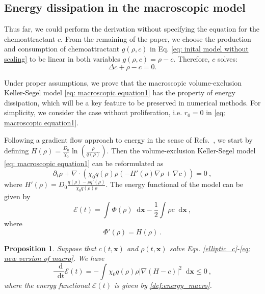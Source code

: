 \documentclass{aims} %
\newtheorem{proposition}[theorem]{Proposition}
\theoremstyle{definition}
\newcommand {\bx} { {\mathbf{x}} }
\newcommand*\diff{\mathop{}\!\mathrm{d}}
\begin{document}
\subsection{Energy dissipation in the macroscopic model} \label{subsec:energy}
Thus far, we could perform the derivation without specifying the equation for the chemoattractant $c$. From the remaining of the paper, we choose the production and consumption of chemoattractant $g(\rho,c)$ in Eq. \eqref{eq: inital model without scaling} to be linear in both variables $g(\rho,c) = \rho - c$. Therefore, $c$ solves:
\begin{equation}\label{elliptic_c}
   \Delta c + \rho - c = 0. 
\end{equation}

Under proper assumptions, we prove that the macroscopic volume-exclusion Keller-Segel model \eqref{eq: macroscopic equation1} has the property of energy dissipation, which will be a key feature to be preserved in numerical methods.
 For simplicity, we consider the case without proliferation, i.e. $r_0 = 0$ in \eqref{eq: macroscopic equation1}. 

Following a gradient flow approach to energy in the sense of Refs.~\cite{de2018energy,calvez2006volume,carrillo2001entropy}, we start by defining $H(\rho) = \frac{D_0}{\chi_0}\ln\left(\frac{\rho}{q(\rho)}\right)$. %
Then the volume-exclusion Keller-Segel model \eqref{eq: macroscopic equation1} can be reformulated as 
\begin{equation}
    \partial_t\rho+\nabla\cdot(\chi_0 q(\rho)\rho(-H'(\rho)\nabla\rho+\nabla c))= 0\ , \label{eq: new version of macro}
\end{equation}
where $H'(\rho)=D_0\frac{q(\rho)-\rho q'(\rho)}{\chi_0 q(\rho)\rho}$.
The energy functional of the model can be given by {{
\begin{equation}\label{def:energy_macro}
    \mathcal{E}(t)=\int\Phi(\rho)\diff \mathbf{x}-\frac{1}{2}\int\rho c\diff \mathbf{x}\ ,
\end{equation}
}}
where 
\begin{equation}\label{functionPhi}
    \Phi'(\rho)=H(\rho)\ .
\end{equation}


\begin{proposition}\label{prop:energy}
Suppose that $c(t,\mathbf{x})$ and $\rho(t,\mathbf{x})$ solve Eqs. \eqref{elliptic_c}-\eqref{eq: new version of macro}. We have
\begin{equation}
    \frac{\diff}{\diff t}\mathcal{E}(t)=-\int \chi_0 q(\rho)\rho|\nabla(H-c)|^2\diff \bx\leq 0\ ,
\end{equation}
where the energy functional $\mathcal{E}(t)$ is given by \eqref{def:energy_macro}.
\end{proposition}
\end{document}

